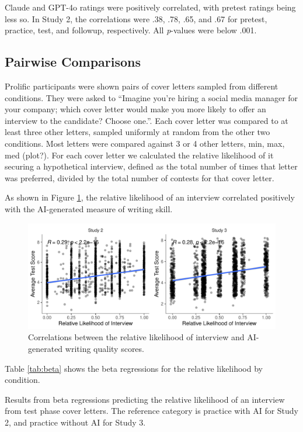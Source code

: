 \documentclass[11pt]{report}
\begin{document}
\begin{append}
Claude and GPT-4o ratings were positively correlated, with pretest ratings being less so. In Study 2, the correlations were .38, .78, .65, and .67 for pretest, practice, test, and followup, respectively. All \textit{p}-values were below .001.

\subsection{Pairwise Comparisons}
Prolific participants were shown pairs of cover letters sampled from different conditions. 
They were asked to ``Imagine you’re hiring a social media manager for your company; which cover letter would make you more likely to offer an interview to the candidate? Choose one.''.
Each cover letter was compared to at least three other letters, sampled uniformly at random from the other two conditions. 
Most letters were compared against 3 or 4 other letters, min, max, med (plot?).
For each cover letter we calculated the relative likelihood of it securing a hypothetical interview, defined as the total number of times that letter was preferred, divided by the total number of contests for that cover letter.

As shown in Figure \ref{fig:ratings_cor}, the relative likelihood of an interview correlated positively with the AI-generated measure of writing skill. 

\begin{figure}[ht]
    \centering
    \includegraphics[width=0.75\linewidth]{correlations.pdf}
    \caption{Correlations between the relative likelihood of interview and AI-generated writing quality scores.}
    \label{fig:ratings_cor}
\end{figure}

Table \ref{tab:beta} shows the beta regressions for the relative likelihood by condition.

\begin{table}[ht]
    \centering
    \caption{Results from beta regressions predicting the relative likelihood of an interview from test phase cover letters. The reference category is practice with AI for Study 2, and practice without AI for Study 3.}


\end{table}
\end{append}
\end{document}
